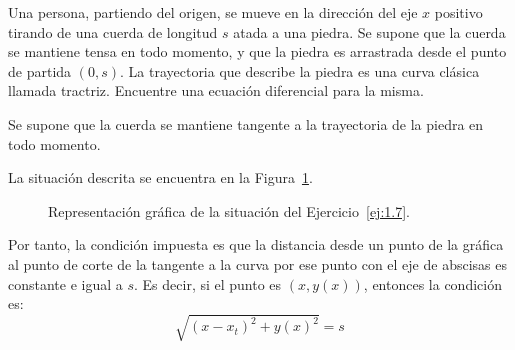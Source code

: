 \begin{ejercicio} \label{ej:1.7}
    Una persona, partiendo del origen, se mueve en la dirección del eje \(x\) positivo tirando de una cuerda de longitud \(s\) atada a una piedra.
    Se supone que la cuerda se mantiene tensa en todo momento, y que la piedra es arrastrada desde el punto de partida \((0, s)\).
    La trayectoria que describe la piedra es una curva clásica llamada tractriz.
    Encuentre una ecuación diferencial para la misma.
    \begin{observacion}
        Se supone que la cuerda se mantiene tangente a la trayectoria de la piedra en todo momento.
    \end{observacion}

    La situación descrita se encuentra en la Figura~\ref{fig:ej1.7}.
    \begin{figure}[H]
        \centering
        \caption{Representación gráfica de la situación del Ejercicio~\ref{ej:1.7}.}
        \label{fig:ej1.7}
    \end{figure}

    Por tanto, la condición impuesta es que la distancia desde un punto de la gráfica al punto de corte de la tangente a la curva por ese punto con el eje de abscisas es constante e igual a $s$. Es decir, si el punto es \((x, y(x))\), entonces la condición es:
    \begin{equation*}
        \sqrt{(x-x_t)^2 + y(x)^2} = s
    \end{equation*}


\end{ejercicio}
